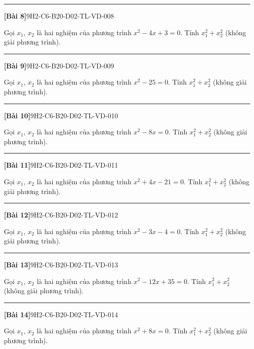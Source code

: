 \documentclass[12pt,a4paper]{article}
\newif\ifloigiai
\newenvironment{cauhoi}[2]{%
  \par\medskip\noindent\rule{\textwidth}{0.4pt}\par\nopagebreak
  \noindent\textbf{[#1]}\hfill{\scriptsize\ttfamily #2}\par\nopagebreak\smallskip}{\par}
\newcommand{\loigiai}[1]{\ifloigiai\par\smallskip\noindent\textit{Lời giải.} #1\par\fi}
\begin{document}
\begin{cauhoi}{Bài 8}{9H2-C6-B20-D02-TL-VD-008}
Gọi $x_1$, $x_2$ là hai nghiệm của phương trình $x^{2}-4x+3=0$. Tính $x_1^{2}+x_2^{2}$ (không giải phương trình).
\loigiai{Theo định lí Viète: $x_1+x_2=4$, $x_1x_2=3$. Suy ra $x_1^{2}+x_2^{2}=(x_1+x_2)^{2}-2x_1x_2=4^{2}-2\cdot(3)=10$.}
\end{cauhoi}
\begin{cauhoi}{Bài 9}{9H2-C6-B20-D02-TL-VD-009}
Gọi $x_1$, $x_2$ là hai nghiệm của phương trình $x^{2}-25=0$. Tính $x_1^{2}+x_2^{2}$ (không giải phương trình).
\loigiai{Theo định lí Viète: $x_1+x_2=0$, $x_1x_2=-25$. Suy ra $x_1^{2}+x_2^{2}=(x_1+x_2)^{2}-2x_1x_2=0^{2}-2\cdot(-25)=50$.}
\end{cauhoi}
\begin{cauhoi}{Bài 10}{9H2-C6-B20-D02-TL-VD-010}
Gọi $x_1$, $x_2$ là hai nghiệm của phương trình $x^{2}-8x=0$. Tính $x_1^{2}+x_2^{2}$ (không giải phương trình).
\loigiai{Theo định lí Viète: $x_1+x_2=8$, $x_1x_2=0$. Suy ra $x_1^{2}+x_2^{2}=(x_1+x_2)^{2}-2x_1x_2=8^{2}-2\cdot(0)=64$.}
\end{cauhoi}
\begin{cauhoi}{Bài 11}{9H2-C6-B20-D02-TL-VD-011}
Gọi $x_1$, $x_2$ là hai nghiệm của phương trình $x^{2}+4x-21=0$. Tính $x_1^{2}+x_2^{2}$ (không giải phương trình).
\loigiai{Theo định lí Viète: $x_1+x_2=-4$, $x_1x_2=-21$. Suy ra $x_1^{2}+x_2^{2}=(x_1+x_2)^{2}-2x_1x_2=-4^{2}-2\cdot(-21)=58$.}
\end{cauhoi}
\begin{cauhoi}{Bài 12}{9H2-C6-B20-D02-TL-VD-012}
Gọi $x_1$, $x_2$ là hai nghiệm của phương trình $x^{2}-3x-4=0$. Tính $x_1^{2}+x_2^{2}$ (không giải phương trình).
\loigiai{Theo định lí Viète: $x_1+x_2=3$, $x_1x_2=-4$. Suy ra $x_1^{2}+x_2^{2}=(x_1+x_2)^{2}-2x_1x_2=3^{2}-2\cdot(-4)=17$.}
\end{cauhoi}
\begin{cauhoi}{Bài 13}{9H2-C6-B20-D02-TL-VD-013}
Gọi $x_1$, $x_2$ là hai nghiệm của phương trình $x^{2}-12x+35=0$. Tính $x_1^{2}+x_2^{2}$ (không giải phương trình).
\loigiai{Theo định lí Viète: $x_1+x_2=12$, $x_1x_2=35$. Suy ra $x_1^{2}+x_2^{2}=(x_1+x_2)^{2}-2x_1x_2=12^{2}-2\cdot(35)=74$.}
\end{cauhoi}
\begin{cauhoi}{Bài 14}{9H2-C6-B20-D02-TL-VD-014}
Gọi $x_1$, $x_2$ là hai nghiệm của phương trình $x^{2}+8x=0$. Tính $x_1^{2}+x_2^{2}$ (không giải phương trình).
\loigiai{Theo định lí Viète: $x_1+x_2=-8$, $x_1x_2=0$. Suy ra $x_1^{2}+x_2^{2}=(x_1+x_2)^{2}-2x_1x_2=-8^{2}-2\cdot(0)=64$.}
\end{cauhoi}
\end{document}
